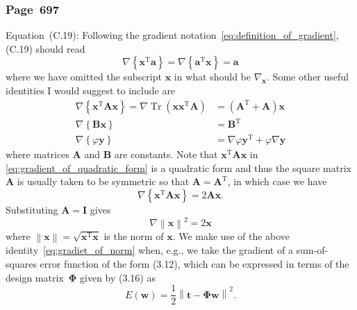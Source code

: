 \documentclass[12pt,a4paper]{article}
\newcommand{\erratum}[1]{\subsubsection*{#1}}
\begin{document}
\erratum{Page~697}
Equation~(C.19):
Following the gradient notation~\eqref{eq:definition_of_gradient}, (C.19) should read
\begin{equation}
\nabla \left\{ \mathbf{x}^{\operatorname{T}} \mathbf{a} \right\} = 
\nabla \left\{ \mathbf{a}^{\operatorname{T}} \mathbf{x} \right\} = 
\mathbf{a}
\end{equation}
where we have omitted the subscript $\mathbf{x}$ in what should be $\nabla_{\mathbf{x}}$.
Some other useful identities I would suggest to include are
\begin{align}
\nabla \left\{ \mathbf{x}^{\operatorname{T}} \mathbf{A} \mathbf{x} \right\} =
\nabla \operatorname{Tr}\left(\mathbf{x}\mathbf{x}^{\operatorname{T}}\mathbf{A}\right) &=
\left( \mathbf{A}^{\operatorname{T}} + \mathbf{A} \right)\mathbf{x}
\label{eq:gradient_of_quadratic_form} \\
\nabla \left\{ \mathbf{B}\mathbf{x} \right\} & = \mathbf{B}^{\operatorname{T}}
\label{eq:gradient_of_matrix_vector_product} \\
\nabla \left\{ \varphi\mathbf{y} \right\} &=
\nabla\varphi \mathbf{y}^{\operatorname{T}} + \varphi \nabla\mathbf{y}
\label{eq:gradient_of_scalar_vector_product}
\end{align}
where matrices $\mathbf{A}$ and $\mathbf{B}$ are constants.
Note that $\mathbf{x}^{\operatorname{T}} \mathbf{A} \mathbf{x}$ in
\eqref{eq:gradient_of_quadratic_form} is a quadratic form and thus
the square matrix $\mathbf{A}$ is usually taken to be symmetric so that
$\mathbf{A} = \mathbf{A}^{\operatorname{T}}$, in which case we have
\begin{equation}
\nabla \left\{ \mathbf{x}^{\operatorname{T}} \mathbf{A} \mathbf{x} \right\} =
2\mathbf{A} \mathbf{x} \label{eq:gradient_of_quadratic_form_symmetric} .
\end{equation}
Substituting $\mathbf{A} = \mathbf{I}$ gives
\begin{equation}
\nabla \left\| \mathbf{x} \right\|^{2} = 2\mathbf{x} \label{eq:gradiet_of_norm}
\end{equation}
where $\left\| \mathbf{x} \right\| = \sqrt{\mathbf{x}^{\operatorname{T}}\mathbf{x}}$ is
the norm of $\mathbf{x}$.
We make use of the above identity~\eqref{eq:gradiet_of_norm} when, e.g., we take the gradient of
a sum-of-squares error function of the form (3.12),
which can be expressed in terms of the design matrix~$\bm{\Phi}$ given by (3.16) as
\begin{equation}
E(\mathbf{w}) = \frac{1}{2} \left\| \mathbf{t} - \bm{\Phi}\mathbf{w} \right\|^2
\label{eq:sum_of_squares_error} .
\end{equation}
\end{document}
